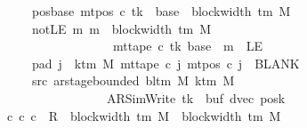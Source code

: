 \begin{isabellebody}
\ \ \ \ \ \ \ pos{\isacharunderscore}{\kern0pt}base{\isacharcolon}{\kern0pt}\ {\isachardoublequoteopen}mt{\isacharunderscore}{\kern0pt}pos\ c{\isacharprime}{\kern0pt}\ tk\ {\isacharequal}{\kern0pt}\ base\ {\isacharplus}{\kern0pt}\ block{\isacharunderscore}{\kern0pt}width\ {\isacharparenleft}{\kern0pt}{\isasymGamma}{\isacharunderscore}{\kern0pt}tm\ M{\isacharparenright}{\kern0pt}{\isachardoublequoteclose}\isanewline
\ \ \ \ \ \ \ notLE{\isacharcolon}{\kern0pt}\ {\isachardoublequoteopen}{\isasymAnd}m{\isachardot}{\kern0pt}\ m\ {\isasymle}\ block{\isacharunderscore}{\kern0pt}width\ {\isacharparenleft}{\kern0pt}{\isasymGamma}{\isacharunderscore}{\kern0pt}tm\ M{\isacharparenright}{\kern0pt}\isanewline
\ \ \ \ \ \ \ \ \ \ \ \ \ \ \ \ \ \ \ {\isasymLongrightarrow}\ mt{\isacharunderscore}{\kern0pt}tape\ c{\isacharprime}{\kern0pt}\ tk\ {\isacharparenleft}{\kern0pt}base\ {\isacharplus}{\kern0pt}\ m{\isacharparenright}{\kern0pt}\ {\isasymnoteq}\ LE{}{\isachardoublequoteclose}\isanewline
\ \ \ \ \ \ \ pad{}{\isacharcolon}{\kern0pt}\ {\isachardoublequoteopen}{\isasymforall}j\ {\isasymge}\ k{\isacharunderscore}{\kern0pt}tm\ M{\isachardot}{\kern0pt}\ mt{\isacharunderscore}{\kern0pt}tape\ c{\isacharprime}{\kern0pt}\ j\ {\isacharparenleft}{\kern0pt}mt{\isacharunderscore}{\kern0pt}pos\ c{\isacharprime}{\kern0pt}\ j{\isacharparenright}{\kern0pt}\ {\isacharequal}{\kern0pt}\ BLANK{}{\isachardoublequoteclose}\isanewline
\ \ \ \ \ \ \ src{}{\isacharcolon}{\kern0pt}\ {\isachardoublequoteopen}ar{\isacharunderscore}{\kern0pt}stage{\isacharunderscore}{\kern0pt}bounded\ {\isacharparenleft}{\kern0pt}bl{\isacharunderscore}{\kern0pt}tm\ M{\isacharparenright}{\kern0pt}\ {\isacharparenleft}{\kern0pt}k{\isacharunderscore}{\kern0pt}tm\ M{\isacharparenright}{\kern0pt}\isanewline
\ \ \ \ \ \ \ \ \ \ \ \ \ \ \ \ \ \ \ {\isacharparenleft}{\kern0pt}AR{\isacharunderscore}{\kern0pt}SimWrite{\isacharcomma}{\kern0pt}\ tk{\isacharcomma}{\kern0pt}\ {}{\isacharcomma}{\kern0pt}\ buf{\isacharcomma}{\kern0pt}\ dvec{\isacharcomma}{\kern0pt}\ posk{\isacharparenright}{\kern0pt}{\isachardoublequoteclose}\isanewline
\ \ \ {\isachardoublequoteopen}{\isasymexists}c{}{\isachardot}{\kern0pt}\ {\isacharparenleft}{\kern0pt}c{\isacharprime}{\kern0pt}{\isacharcomma}{\kern0pt}\ c{}{\isacharparenright}{\kern0pt}\ {\isasymin}\ R{\isacharprime}{\kern0pt}\ {\isacharcircum}{\kern0pt}{\isacharcircum}{\kern0pt}\ {\isacharparenleft}{\kern0pt}block{\isacharunderscore}{\kern0pt}width\ {\isacharparenleft}{\kern0pt}{\isasymGamma}{\isacharunderscore}{\kern0pt}tm\ M{\isacharparenright}{\kern0pt}\ {\isacharplus}{\kern0pt}\ {\isacharparenleft}{\kern0pt}block{\isacharunderscore}{\kern0pt}width\ {\isacharparenleft}{\kern0pt}{\isasymGamma}{\isacharunderscore}{\kern0pt}tm\ M{\isacharparenright}{\kern0pt}\ {\isacharminus}{\kern0pt}\ {}{\isacharparenright}{\kern0pt}{\isacharparenright}{\kern0pt}\isanewline

\end{isabellebody}

